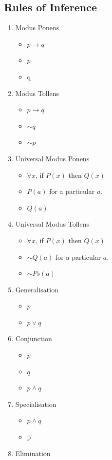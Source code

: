 \documentclass[12pt]{article}
\begin{document}
\subsection{Rules of Inference}
\begin{enumerate}
\item Modus Ponens
\begin{itemize}
\item[] $p\to q$
\item[] $p$
\item q
\end{itemize}
\item Modus Tollens
\begin{itemize}
\item[]$p\to q$
\item[] $\sim q$
\item $\sim p$
\end{itemize}
\item Universal Modus Ponens
\begin{itemize}
\item[] $\forall x$, if $P(x)$ then $Q(x)$
\item[] $P(a)$ for a particular $a$.
\item $Q(a)$
\end{itemize}
\item Universal Modus Tollens
\begin{itemize}
\item[] $\forall x$, if $P(x)$ then $Q(x)$
\item[] $\sim Q(a)$ for a particular $a$.
\item $\sim Ps(a)$
\end{itemize}
\item Generalisation
\begin{itemize}
\item[] $p$
\item $p\lor q$
\end{itemize}
\item Conjunction
\begin{itemize}
\item[] $p$
\item[] $q$
\item $p\land q$
\end{itemize}
\item Specialisation
\begin{itemize}
\item[] $p\land q$
\item p
\end{itemize}
\item Elimination

\end{enumerate}
\end{document}

